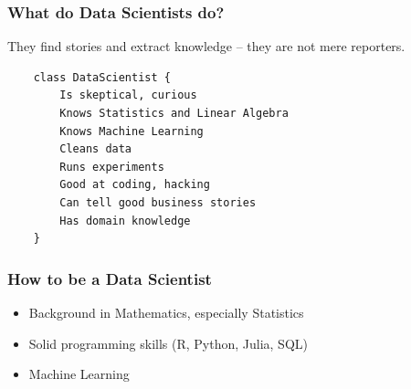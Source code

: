 \begin{frame}[fragile]\frametitle{What do Data Scientists do?}
They find stories and extract knowledge -- they are not mere reporters.
\begin{lstlisting}
	class DataScientist {
		Is skeptical, curious
		Knows Statistics and Linear Algebra
		Knows Machine Learning
		Cleans data
		Runs experiments
		Good at coding, hacking
		Can tell good business stories
		Has domain knowledge
	}
\end{lstlisting}
\end{frame}

\begin{frame}[fragile]\frametitle{How to be a Data Scientist}
	\begin{itemize}
	\item Background in Mathematics, especially Statistics
	\item Solid programming skills (R, Python, Julia, SQL)
	\item Machine Learning
	\end{itemize}
\end{frame}

%
%

%

